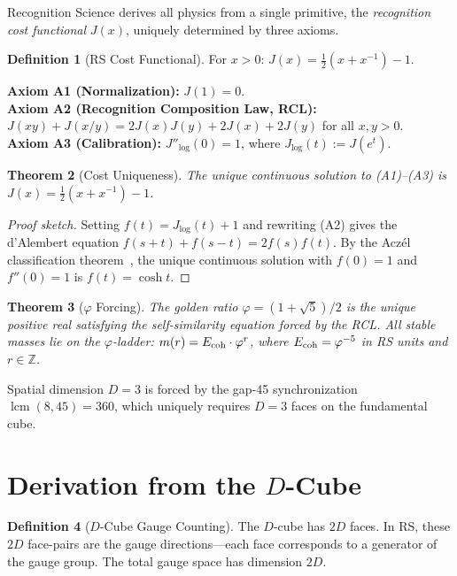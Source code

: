 \documentclass[12pt,a4paper]{article}
\newtheorem{theorem}{Theorem}[section]
\theoremstyle{definition}
\newtheorem{definition}[theorem]{Definition}
\theoremstyle{remark}
\begin{document}
Recognition Science derives all physics from a single primitive,
the \emph{recognition cost functional} $J(x)$, uniquely determined
by three axioms.

\begin{definition}[RS Cost Functional]
For $x > 0$: $J(x) = \tfrac{1}{2}(x + x^{-1}) - 1$.
\end{definition}

\noindent\textbf{Axiom A1 (Normalization):} $J(1) = 0$.\\
\textbf{Axiom A2 (Recognition Composition Law, RCL):}
$J(xy) + J(x/y) = 2J(x)J(y) + 2J(x) + 2J(y)$ for all $x, y > 0$.\\
\textbf{Axiom A3 (Calibration):} $J''_{\log}(0) = 1$, where
$J_{\log}(t) := J(e^t)$.

\begin{theorem}[Cost Uniqueness]
\label{thm:unique}
The unique continuous solution to \textup{(A1)--(A3)} is
$J(x) = \tfrac{1}{2}(x + x^{-1}) - 1$.
\end{theorem}

\begin{proof}[Proof sketch]
Setting $f(t) = J_{\log}(t) + 1$ and rewriting \textup{(A2)} gives the
d'Alembert equation $f(s+t) + f(s-t) = 2f(s)f(t)$.  By the Acz\'el
classification theorem~\cite{Aczel1966}, the unique continuous solution
with $f(0) = 1$ and $f''(0) = 1$ is $f(t) = \cosh t$.
\end{proof}

\begin{theorem}[$\varphi$ Forcing]
\label{thm:phi}
The golden ratio $\varphi = (1+\sqrt{5})/2$ is the unique positive real
satisfying the self-similarity equation forced by the RCL\@.  All stable
masses lie on the $\varphi$-ladder: $m(r) = E_{\rm coh}\cdot\varphi^r$,
where $E_{\rm coh} = \varphi^{-5}$ in RS units and $r \in \mathbb{Z}$.
\end{theorem}

\noindent Spatial dimension $D = 3$ is forced by the gap-45 synchronization
$\operatorname{lcm}(8,45) = 360$, which uniquely requires $D = 3$ faces on
the fundamental cube.

\section{Derivation from the $D$-Cube}
\label{sec:derivation}

\begin{definition}[$D$-Cube Gauge Counting]
\label{def:gauge}
The $D$-cube has $2D$ faces.  In RS, these $2D$ face-pairs are
the gauge directions---each face corresponds to a generator of
the gauge group.  The total gauge space has dimension $2D$.
\end{definition}
\end{document}
